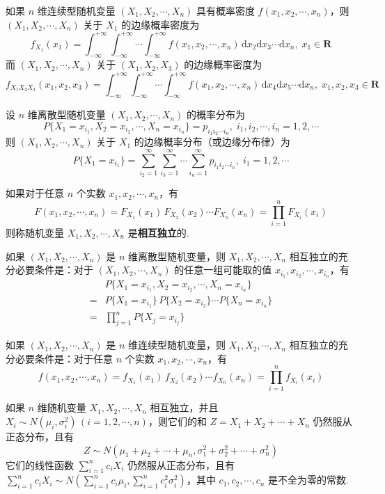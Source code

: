 如果 $n$ 维连续型随机变量 $(X_1,X_2,\cdots,X_n)$ 具有概率密度 $f(x_1,x_2,\cdots,x_n)$，则 \\
$(X_1,X_2,\cdots,X_n)$ 关于 $X_1$ 的边缘概率密度为
$$
f_{X_1}(x_1) = \int_{-\infty}^{+\infty} \int_{-\infty}^{+\infty} \cdots \int_{-\infty}^{+\infty} f(x_1,x_2,\cdots,x_n) \, \text{d}x_2 \text{d}x_3 \cdots \text{d}x_n, \; x_1 \in \mathbf{R}
$$
而 $(X_1,X_2,\cdots,X_n)$ 关于 $(X_1,X_2,X_3)$ 的边缘概率密度为
$$
f_{X_1 X_2 X_3}(x_1,x_2,x_3) = \int_{-\infty}^{+\infty} \int_{-\infty}^{+\infty} \cdots \int_{-\infty}^{+\infty} f(x_1,x_2,\cdots,x_n) \, \text{d}x_4 \text{d}x_5 \cdots \text{d}x_n, \; x_1,x_2,x_3 \in \mathbf{R}
$$

设 $n$ 维离散型随机变量 $(X_1,X_2,\cdots,X_n)$ 的概率分布为
$$
P\{X_1 = x_{i_1}, X_2 = x_{i_2}, \cdots, X_n = x_{i_n}\} = p_{i_1 i_2 \cdots i_n}, \; i_1, i_2, \cdots, i_n = 1,2,\cdots
$$
则 $(X_1,X_2,\cdots,X_n)$ 关于 $X_1$ 的边缘概率分布（或边缘分布律）为
$$
P\{X_1=x_{i_1}\} = \sum_{i_2=1}^{\infty} \sum_{i_3=1}^{\infty} \cdots \sum_{i_n=1}^{\infty} p_{i_1 i_2 \cdots i_n}, \; i_1 = 1,2,\cdots
$$

如果对于任意 $n$ 个实数 $x_1,x_2,\cdots,x_n$，有
$$
F(x_1,x_2,\cdots,x_n) = F_{X_1}(x_1) \, F_{X_2}(x_2) \cdots F_{X_n}(x_n) = \prod_{i=1}^n F_{X_i}(x_i)
$$
则称随机变量 $X_1,X_2,\cdots,X_n$ 是\textbf{相互独立}的.

如果 $(X_1,X_2,\cdots,X_n)$ 是 $n$ 维离散型随机变量，则 $X_1,X_2,\cdots,X_n$ 相互独立的充分必要条件是：对于 $(X_1,X_2,\cdots,X_n)$ 的任意一组可能取的值 $x_{i_1}, x_{i_2}, \cdots, x_{i_n}$，有
$$
\begin{aligned}
    & P\{X_1 = x_{i_1}, X_2 = x_{i_2}, \cdots, X_n = x_{i_n}\} \\
    = & P\{X_1 = x_{i_1}\} \, P\{X_2 = x_{i_2}\} \cdots P\{X_n = x_{i_n}\} \\
    = & \prod_{j=1}^n P\{X_j = x_{i_j}\}
\end{aligned}
$$

如果 $(X_1,X_2,\cdots,X_n)$ 是 $n$ 维连续型随机变量，则 $X_1,X_2,\cdots,X_n$ 相互独立的充分必要条件是：对于任意 $n$ 个实数 $x_1,x_2,\cdots,x_n$，有
$$
f(x_1,x_2,\cdots,x_n) = f_{X_1}(x_1) \, f_{X_2}(x_2) \cdots f_{X_n}(x_n) = \prod_{i=1}^n f_{X_i}(x_i)
$$

如果 $n$ 维随机变量 $X_1,X_2,\cdots,X_n$ 相互独立，并且 $X_i \sim N(\mu_i, \sigma_i^2) \, (i=1,2,\cdots,n)$，则它们的和 $Z = X_1 + X_2 + \cdots + X_n$ 仍然服从正态分布，且有
$$
Z \sim N(\mu_1 + \mu_2 + \cdots + \mu_n, \sigma_1^2 + \sigma_2^2 + \cdots + \sigma_n^2)
$$
它们的线性函数 $\displaystyle\sum_{i=1}^n c_i X_i$ 仍然服从正态分布，且有 $\displaystyle\sum_{i=1}^n c_i X_i \sim N(\displaystyle\sum_{i=1}^n c_i \mu_i, \displaystyle\sum_{i=1}^n c_i^2 \sigma_i^2)$，其中 $c_1,c_2,\cdots,c_n$ 是不全为零的常数.

